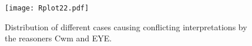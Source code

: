 \begin{figure}\centering
 \texttt{[image: Rplot22.pdf]}
 \caption{Distribution of different cases causing conflicting interpretations by the reasoners Cwm and EYE.\label{result2}}
\end{figure}
% 
